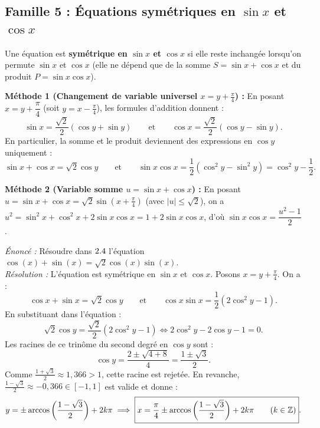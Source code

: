 \subsection{Famille 5 : Équations symétriques en $\sin x$ et $\cos x$}

\begin{definition}[Équation symétrique et changement de variable $x = y + \frac{\pi}{4}$]
Une équation est \textbf{symétrique en $\sin x$ et $\cos x$} si elle reste inchangée lorsqu'on permute $\sin x$ et $\cos x$ (elle ne dépend que de la somme $S = \sin x + \cos x$ et du produit $P = \sin x \cos x$).

\textbf{Méthode 1 (Changement de variable universel $x = y + \frac{\pi}{4}$) :}
En posant $\boxed{x = y + \dfrac{\pi}{4}}$ (soit $y = x - \frac{\pi}{4}$), les formules d'addition donnent :
\[
    \boxed{\sin x = \frac{\sqrt{2}}{2}(\cos y + \sin y) \qquad \text{et} \qquad \cos x = \frac{\sqrt{2}}{2}(\cos y - \sin y)}.
\]
En particulier, la somme et le produit deviennent des expressions en $\cos y$ uniquement :
\[
    \sin x + \cos x = \sqrt{2}\cos y \qquad \text{et} \qquad \sin x \cos x = \frac{1}{2}(\cos^2 y - \sin^2 y) = \cos^2 y - \frac{1}{2}.
\]

\textbf{Méthode 2 (Variable somme $u = \sin x + \cos x$) :}
En posant $u = \sin x + \cos x = \sqrt{2}\sin\left(x + \frac{\pi}{4}\right)$ (avec $|u| \le \sqrt{2}$), on a $u^2 = \sin^2 x + \cos^2 x + 2\sin x\cos x = 1 + 2\sin x\cos x$, d'où $\sin x \cos x = \dfrac{u^2 - 1}{2}$.
\end{definition}

\begin{exemple}
\emph{Énoncé :} Résoudre dans $2.4$ l'équation $\cos(x) + \sin(x) = \sqrt{2}\cos(x)\sin(x)$.\\
\emph{Résolution :} L'équation est symétrique en $\sin x$ et $\cos x$. Posons $x = y + \frac{\pi}{4}$. On a :
\[
    \cos x + \sin x = \sqrt{2}\cos y \qquad \text{et} \qquad \cos x \sin x = \frac{1}{2}(2\cos^2 y - 1).
\]
En substituant dans l'équation :
\[
    \sqrt{2}\cos y = \frac{\sqrt{2}}{2}(2\cos^2 y - 1) \iff 2\cos^2 y - 2\cos y - 1 = 0.
\]
Les racines de ce trinôme du second degré en $\cos y$ sont :
\[
    \cos y = \frac{2 \pm \sqrt{4 + 8}}{4} = \frac{1 \pm \sqrt{3}}{2}.
\]
Comme $\frac{1+\sqrt{3}}{2} \approx 1,366 > 1$, cette racine est rejetée. En revanche, $\frac{1-\sqrt{3}}{2} \approx -0,366 \in [-1, 1]$ est valide et donne :
\[
    y = \pm\arccos\left(\frac{1-\sqrt{3}}{2}\right) + 2k\pi \implies \boxed{x = \frac{\pi}{4} \pm \arccos\left(\frac{1-\sqrt{3}}{2}\right) + 2k\pi \qquad (k \in \mathbb{Z})}.
\]
\end{exemple}

